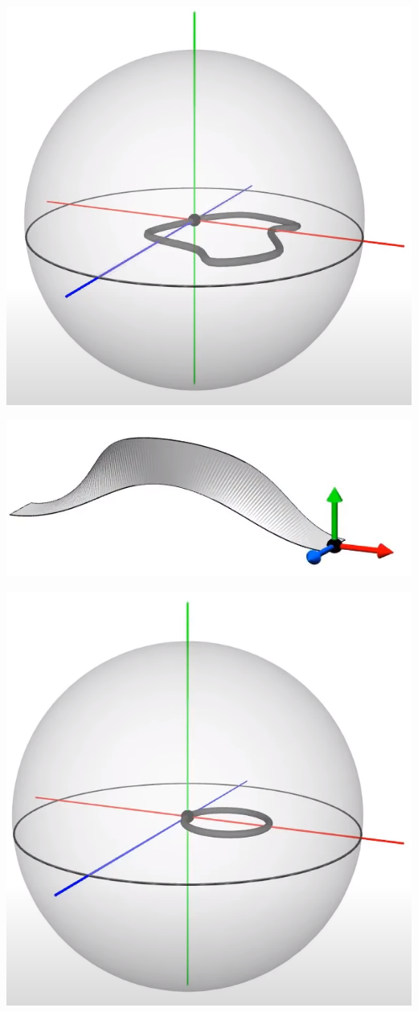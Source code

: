 \documentclass[10pt]{beamer}
\begin{document}
\begin{frame}
    \includegraphics[scale=0.1]{Pictures/randomrotsphere.png}

    \includegraphics[scale=0.1]{Pictures/contractiblepathbelt.png}

    \includegraphics[scale=0.1]{Pictures/contractiblepathsphere.png}


\end{frame}
\end{document}
